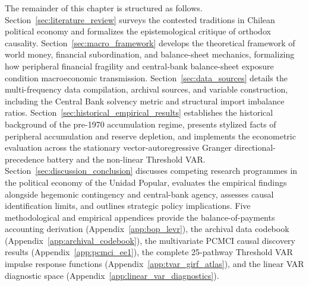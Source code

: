 The remainder of this chapter is structured as follows. Section~\ref{sec:literature_review} surveys the contested traditions in Chilean political economy and formalizes the epistemological critique of orthodox causality. Section~\ref{sec:macro_framework} develops the theoretical framework of world money, financial subordination, and balance-sheet mechanics, formalizing how peripheral financial fragility and central-bank balance-sheet exposure condition macroeconomic transmission. Section~\ref{sec:data_sources} details the multi-frequency data compilation, archival sources, and variable construction, including the Central Bank solvency metric and structural import imbalance ratios. Section~\ref{sec:historical_empirical_results} establishes the historical background of the pre-1970 accumulation regime, presents stylized facts of peripheral accumulation and reserve depletion, and implements the econometric evaluation across the stationary vector-autoregressive Granger directional-precedence battery and the non-linear Threshold VAR. Section~\ref{sec:discussion_conclusion} discusses competing research programmes in the political economy of the Unidad Popular, evaluates the empirical findings alongside hegemonic contingency and central-bank agency, assesses causal identification limits, and outlines strategic policy implications. Five methodological and empirical appendices provide the balance-of-payments accounting derivation (Appendix~\ref{app:bop_levr}), the archival data codebook (Appendix~\ref{app:archival_codebook}), the multivariate PCMCI causal discovery results (Appendix~\ref{app:pcmci_ee1}), the complete 25-pathway Threshold VAR impulse response functions (Appendix~\ref{app:tvar_girf_atlas}), and the linear VAR diagnostic space (Appendix~\ref{app:linear_var_diagnostics}).

